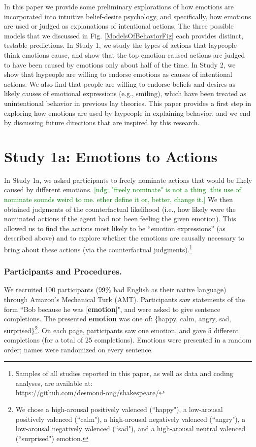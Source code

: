 \documentclass[10pt,letterpaper]{article}
\newcommand{\ndg}[1]{\textcolor{Green}{[ndg: #1]}}
\begin{document}
In this paper we provide some preliminary explorations of how emotions are incorporated into intuitive belief-desire psychology, and specifically, how emotions are used or judged as explanations of intentional actions. The three possible models that we discussed in Fig. \ref{ModelsOfBehaviorFig} each provides distinct, testable predictions. In Study 1, we study the types of actions that laypeople think emotions cause, and show that the top emotion-caused actions are judged to have been caused by emotions only about half of the time. In Study 2, we show that laypeople are willing to endorse emotions as causes of intentional actions. We also find that people are willing to endorse beliefs and desires as likely causes of emotional expressions (e.g., smiling), which have been treated as unintentional behavior in previous lay theories. This paper provides a first step in exploring how emotions are used by laypeople in explaining behavior, and we end by discussing future directions that are inspired by this research.



\section{Study 1a: Emotions to Actions}

	In Study 1a, we asked participants to freely nominate actions that would be likely caused by different emotions. 
	\ndg{"freely nominate" is not a thing. this use of nominate sounds weird to me. ether define it or, better, change it.}
	We then obtained judgments of the counterfactual likelihood (i.e., how likely were the nominated actions if the agent had not been feeling the given emotion). 
	This allowed us to find the actions most likely to be ``emotion expressions'' (as described above) %
and to explore whether the emotions are causally necessary to bring about these actions (via the counterfactual judgments).\footnote{Samples of all studies reported in this paper, as well as data and coding analyses, are available at: \\https://github.com/desmond-ong/shakespeare/}



\subsubsection{Participants and Procedures.} 
We recruited 100 participants (99\% had English as their native language) through Amazon's Mechanical Turk (AMT). Participants saw statements of the form ``Bob \underline{\hspace{2em}} because he was [\textbf{emotion}]", and were asked to give sentence completions. The presented \textbf{emotion} was one of: \{happy, calm, angry, sad, surprised\}\footnote{We chose a high-arousal positively valenced (``happy"), a low-arousal positively valenced (``calm"), a high-arousal negatively valenced (``angry"), a low-arousal negatively valenced (``sad"), and a high-arousal neutral valenced (``surprised") emotion.}. On each page, participants saw one emotion, and gave 5 different completions (for a total of 25 completions). Emotions were presented in a random order; names were randomized on every sentence.
\end{document}
